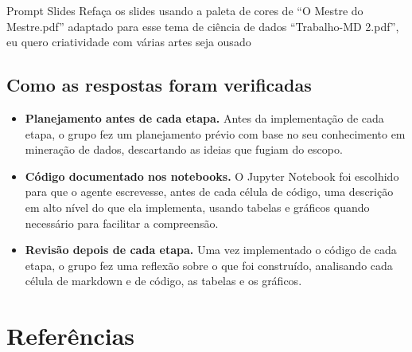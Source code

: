 \documentclass[11pt,a4paper]{article}
\begin{document}
\begin{prompt}{Prompt Slides}
Refaça os slides usando a paleta de cores de ``O Mestre do Mestre.pdf'' adaptado para esse tema de ciência de dados
``Trabalho-MD 2.pdf'', eu quero criatividade com várias artes seja ousado
\end{prompt}

\subsection*{Como as respostas foram verificadas}

\begin{itemize}
  \item \textbf{Planejamento antes de cada etapa.} Antes da implementação de cada etapa, o grupo fez um planejamento
        prévio com base no seu conhecimento em mineração de dados, descartando as ideias que fugiam do escopo.
  \item \textbf{Código documentado nos notebooks.} O Jupyter Notebook foi escolhido para que o agente escrevesse, antes
        de cada célula de código, uma descrição em alto nível do que ela implementa, usando tabelas e gráficos quando
        necessário para facilitar a compreensão.
  \item \textbf{Revisão depois de cada etapa.} Uma vez implementado o código de cada etapa, o grupo fez uma reflexão
        sobre o que foi construído, analisando cada célula de markdown e de código, as tabelas e os gráficos.
\end{itemize}

\section{Referências}
\end{document}
